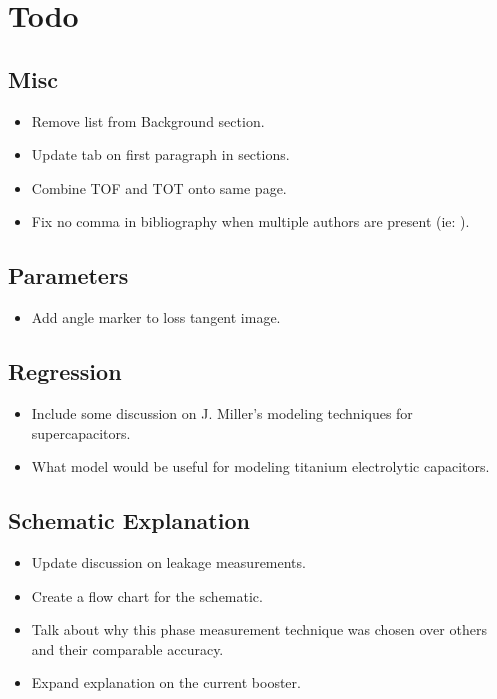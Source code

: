 \section{Todo}

\subsection{Misc}
\begin{itemize}
    \item Remove list from Background section.
    \item Update tab on first paragraph in sections.
    \item Combine TOF and TOT onto same page.
    \item Fix no comma in bibliography when multiple authors are present (ie: \cite{absCircuit}).
\end{itemize}

\subsection{Parameters}
\begin{itemize}
    \item Add angle marker to loss tangent image.
\end{itemize}

\subsection{Regression}
\begin{itemize}
    \item Include some discussion on J. Miller's modeling techniques for supercapacitors.
    \item What model would be useful for modeling titanium electrolytic capacitors.
\end{itemize}

\subsection{Schematic Explanation}
\begin{itemize}
    \item Update discussion on leakage measurements.
    \item Create a flow chart for the schematic.
    \item Talk about why this phase measurement technique was chosen over others and their comparable accuracy.
    \item Expand explanation on the current booster.
\end{itemize}

